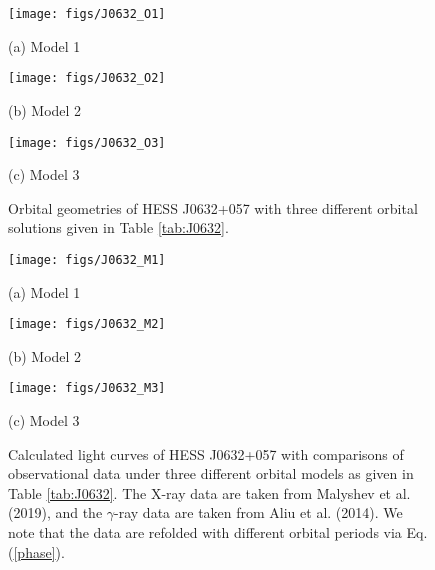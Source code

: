 \documentclass{aa}
\def\HESSJ0632{HESS J0632+057}
\begin{document}
\begin{figure}%
\begin{minipage}{\linewidth}
  \centerline{\texttt{[image: figs/J0632\_O1]}}
  \centerline{(a) Model 1}
\end{minipage}
\vfill
\begin{minipage}{\linewidth}
  \centerline{\texttt{[image: figs/J0632\_O2]}}
  \centerline{(b) Model 2}
\end{minipage}
\vfill
\begin{minipage}{\linewidth}
  \centerline{\texttt{[image: figs/J0632\_O3]}}
  \centerline{(c) Model 3}
\end{minipage}
\caption{Orbital geometries of \HESSJ0632 with three different orbital solutions given in Table \ref{tab:J0632}.}
\label{fig:J0632_O}
\end{figure}


\begin{figure}
\begin{minipage}{\linewidth}
  \centerline{\texttt{[image: figs/J0632\_M1]}}
  \centerline{(a) Model 1}
\end{minipage}
\vfill
\begin{minipage}{\linewidth}
  \centerline{\texttt{[image: figs/J0632\_M2]}}
  \centerline{(b) Model 2}
\end{minipage}
\vfill
\begin{minipage}{\linewidth}
  \centerline{\texttt{[image: figs/J0632\_M3]}}
  \centerline{(c) Model 3}
\end{minipage}
\caption{Calculated light curves of \HESSJ0632 with comparisons of observational data under three different orbital models as given in Table \ref{tab:J0632}. The X-ray data are taken from Malyshev et al. (2019), and the $\gamma$-ray data are taken from Aliu et al. (2014). We note that the data are refolded with different orbital periods via Eq. (\ref{phase}).}
\label{fig:J0632}
\end{figure}


\clearpage
\end{document}
